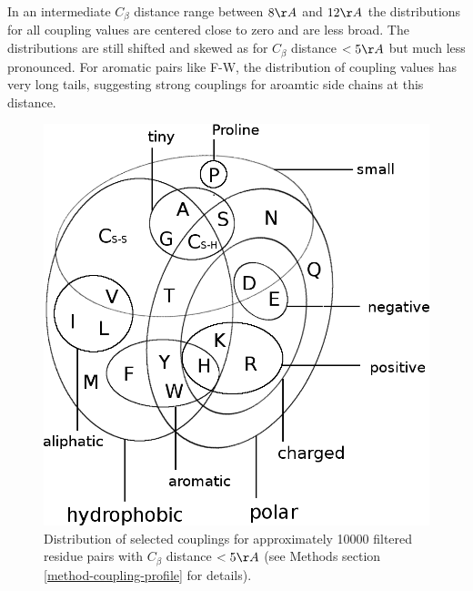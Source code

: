 \documentclass[12pt,a4paper,twoside]{book}
\newcommand{\Cb}{C_\beta}
\theoremstyle{definition}
\theoremstyle{definition}
\theoremstyle{remark}
\begin{document}
In an intermediate \(\Cb\) distance range between \(8\AA\) and \(12\AA\)
the distributions for all coupling values are centered close to zero and
are less broad. The distributions are still shifted and skewed as for
\(\Cb\) distance \(< 5\AA\) but much less pronounced. For aromatic pairs
like F-W, the distribution of coupling values has very long tails,
suggesting strong couplings for aroamtic side chains at this distance.






\begin{figure}
\includegraphics[width=1\linewidth]{img/amino_acid_physico_chemical_properties_venn_diagramm} \caption{Distribution of selected
couplings for approximately 10000 filtered residue pairs with \(\Cb\)
distance \(< 5\AA\) (see Methods section \ref{method-coupling-profile}
for details).}\label{fig:1d-coupling-profile-8-12}
\end{figure}
\end{document}
